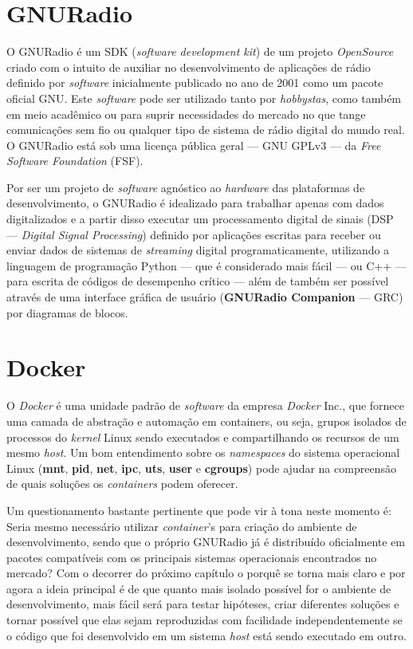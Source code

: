 \documentclass[
  12pt,				%
  openright,			%
  twoside,			%
  a4paper,			%
  english,			%
  french,				%
  spanish,			%
  brazil,				%
  ]{abntex2}
\begin{document}
\section*{GNURadio}

O GNURadio é um SDK (\textit{software development kit}) de um projeto \textit{OpenSource} criado com o intuito de auxiliar no desenvolvimento de aplicações de
rádio definido por \textit{software} inicialmente publicado no ano de 2001 como um pacote oficial GNU. Este \textit{software} pode ser utilizado tanto por \textit{hobbystas}, como
também em meio acadêmico ou para suprir necessidades do mercado no que tange comunicações sem fio ou qualquer tipo de sistema de rádio digital do mundo real.
O GNURadio está sob uma licença pública geral — GNU GPLv3 — da \textit{Free Software Foundation} (FSF).

Por ser um projeto de \textit{software} agnóstico ao \textit{hardware} das plataformas de desenvolvimento, o GNURadio é idealizado
para trabalhar apenas com dados digitalizados e a partir disso executar um processamento digital de sinais (DSP — \textit{Digital Signal Processing})
definido por aplicações escritas para receber ou enviar dados de sistemas de \textit{streaming} digital programaticamente, utilizando a linguagem de programação
Python — que é considerado mais fácil — ou C++ — para escrita de códigos de desempenho crítico — além de também ser possível através de uma interface gráfica de
usuário (\textbf{GNURadio Companion} — GRC) por diagramas de blocos.

\newpage
\section*{Docker}

O \textit{Docker} é uma unidade padrão de \textit{software} da empresa \textit{Docker} Inc., que fornece uma camada de abstração e automação em containers, ou seja, grupos isolados de
processos do \textit{kernel} Linux sendo executados e compartilhando os recursos de um mesmo \textit{host}. Um bom entendimento sobre os \textit{namespaces} do  sistema operacional
Linux (\textbf{mnt}, \textbf{pid}, \textbf{net}, \textbf{ipc}, \textbf{uts}, \textbf{user} e \textbf{cgroups}) pode ajudar na compreensão de quais soluções os
\textit{containers} podem oferecer.

Um questionamento bastante pertinente que pode vir à tona neste momento é: Seria mesmo necessário utilizar \textit{container}'s para criação
do ambiente de desenvolvimento, sendo que o próprio GNURadio já é distribuído oficialmente em pacotes compatíveis com os principais sistemas
operacionais encontrados no mercado? Com o decorrer do próximo capítulo o porquê se torna mais claro e por agora a ideia principal é de
que quanto mais isolado possível for o ambiente de desenvolvimento, mais fácil será para testar hipóteses, criar diferentes soluções e tornar
possível que elas sejam reproduzidas com facilidade independentemente se o código que foi desenvolvido em um sistema \textit{host} está sendo executado em outro.
\end{document}
